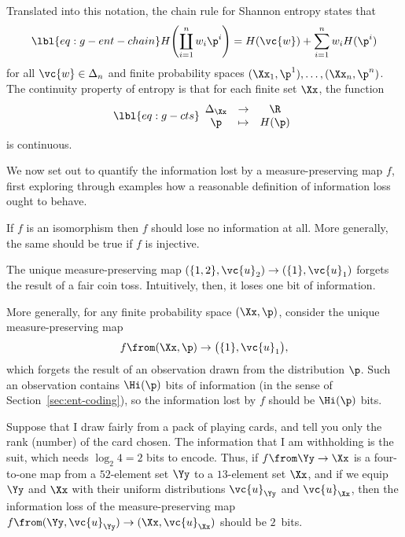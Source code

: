 Translated into this notation, the chain rule for Shannon entropy
states that
% 
\begin{equation}
\lbl{eq:g-ent-chain}
H\Biggl( \coprod_{i = 1}^n w_i \p^i \Biggr)
=
H(\vc{w}) + \sum_{i = 1}^n w_i H(\p^i)
\end{equation}
% 
for all $\vc{w} \in \Delta_n$ and finite probability spaces $(\Xx_1, \p^1),
\ldots, (\Xx_n, \p^n)$. The continuity property of entropy is that for
each finite set $\Xx$, the function
% 
\begin{equation}
\lbl{eq:g-cts}
\begin{array}{ccc}
\Delta_\Xx        &\to            &\R     \\
\p              &\mapsto        &H(\p)
\end{array}
\end{equation}
% 
is continuous.

We now set out to quantify the information lost by a measure-preserving map
$f$, first exploring through examples how a reasonable definition of
information loss ought to behave.

\begin{example}
If $f$ is an isomorphism then $f$ should lose no information at all.
More generally, the same should be true if $f$ is injective. 
\end{example}

\begin{example}
The unique measure-preserving map $(\{1, 2\}, \vc{u}_2) \to (\{1\},
\vc{u}_1)$ forgets the result of a fair coin%
%
% 
toss.  Intuitively, then, it loses one bit of information.
\end{example}

\begin{example}
More generally, for any finite probability space $(\Xx, \p)$, consider the
unique measure-preserving map
\[
f \from (\Xx, \p)
\to 
\bigl(\{1\}, \vc{u}_1\bigr),
\]
which forgets the result of an observation drawn from the distribution $\p$.
Such an observation contains $\Hi(\p)$ bits of information (in the sense
of Section~\ref{sec:ent-coding}), so the information lost by $f$ should be
$\Hi(\p)$ bits.
\end{example}

\begin{example}
Suppose that I draw fairly from a pack of playing cards,%
%
% 
and tell you only the rank (number) of the card chosen.  The
information that I am withholding is the suit, which needs $\log_2 4 = 2$
bits to encode.  Thus, if $f \from \Yy \to \Xx$ is a four-to-one map from a
$52$-element set $\Yy$ to a $13$-element set $\Xx$, and if we equip $\Yy$
and $\Xx$ with their uniform distributions $\vc{u}_\Yy$ and $\vc{u}_\Xx$,
then the information loss of the measure-preserving map $f \from (\Yy,
\vc{u}_\Yy) \to (\Xx, \vc{u}_\Xx)$ should be $2$~bits.
\end{example}

